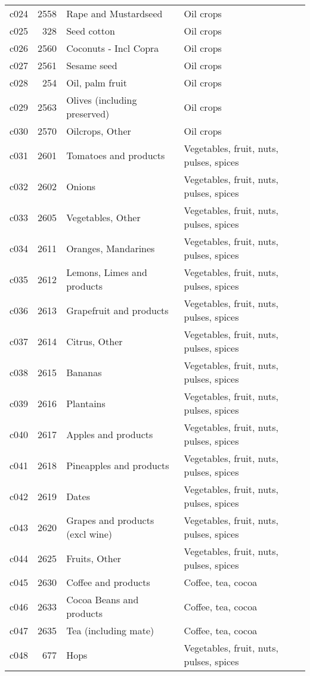 \documentclass[]{article}
\begin{document}
\begin{longtable}[t]{lrll}
c024 & 2558 & Rape and Mustardseed & Oil crops\\
c025 & 328 & Seed cotton & Oil crops\\
\addlinespace
c026 & 2560 & Coconuts - Incl Copra & Oil crops\\
c027 & 2561 & Sesame seed & Oil crops\\
c028 & 254 & Oil, palm fruit & Oil crops\\
c029 & 2563 & Olives (including preserved) & Oil crops\\
c030 & 2570 & Oilcrops, Other & Oil crops\\
\addlinespace
c031 & 2601 & Tomatoes and products & Vegetables, fruit, nuts, pulses, spices\\
c032 & 2602 & Onions & Vegetables, fruit, nuts, pulses, spices\\
c033 & 2605 & Vegetables, Other & Vegetables, fruit, nuts, pulses, spices\\
c034 & 2611 & Oranges, Mandarines & Vegetables, fruit, nuts, pulses, spices\\
c035 & 2612 & Lemons, Limes and products & Vegetables, fruit, nuts, pulses, spices\\
\addlinespace
c036 & 2613 & Grapefruit and products & Vegetables, fruit, nuts, pulses, spices\\
c037 & 2614 & Citrus, Other & Vegetables, fruit, nuts, pulses, spices\\
c038 & 2615 & Bananas & Vegetables, fruit, nuts, pulses, spices\\
c039 & 2616 & Plantains & Vegetables, fruit, nuts, pulses, spices\\
c040 & 2617 & Apples and products & Vegetables, fruit, nuts, pulses, spices\\
\addlinespace
c041 & 2618 & Pineapples and products & Vegetables, fruit, nuts, pulses, spices\\
c042 & 2619 & Dates & Vegetables, fruit, nuts, pulses, spices\\
c043 & 2620 & Grapes and products (excl wine) & Vegetables, fruit, nuts, pulses, spices\\
c044 & 2625 & Fruits, Other & Vegetables, fruit, nuts, pulses, spices\\
c045 & 2630 & Coffee and products & Coffee, tea, cocoa\\
\addlinespace
c046 & 2633 & Cocoa Beans and products & Coffee, tea, cocoa\\
c047 & 2635 & Tea (including mate) & Coffee, tea, cocoa\\
c048 & 677 & Hops & Vegetables, fruit, nuts, pulses, spices\\

\end{longtable}
\end{document}
